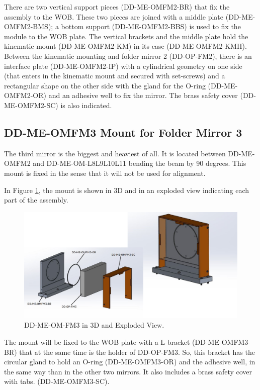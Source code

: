 \documentclass{report}
\begin{document}
There are two vertical support pieces (DD-ME-OMFM2-BR) that fix the assembly to the WOB. These two pieces are joined with a middle plate (DD-ME-OMFM2-BMS); a bottom support (DD-ME-OMFM2-BBS) is used to fix the module to the WOB plate. The vertical brackets and the middle plate hold the kinematic mount (DD-ME-OMFM2-KM) in its case (DD-ME-OMFM2-KMH).
Between the kinematic mounting and folder mirror 2 (DD-OP-FM2), there is an interface plate (DD-ME-OMFM2-IP) with a cylindrical geometry on one side (that enters in the kinematic mount and secured with set-screws) and a rectangular shape on the other side with the gland for the O-ring (DD-ME-OMFM2-OR) and an adhesive well to fix the mirror. The brass safety cover (DD-ME-OMFM2-SC) is also indicated.


\subsection{DD-ME-OMFM3 Mount for Folder Mirror 3}

The third mirror is the biggest and heaviest of all. It is located between DD-ME-OMFM2 and DD-ME-OM-L8L9L10L11 bending the beam by 90 degrees. This mount is fixed in the sense that it will not be used for alignment.

In Figure \ref{figure:FM3}, the mount is shown in 3D and in an exploded view indicating each part of the assembly.

\begin{figure}
\begin{center}
\includegraphics[width=1.0\linewidth]{figures/FM3-ExV.png}
\end{center}
\caption{DD-ME-OM-FM3 in 3D and Exploded View.}
\label{figure:FM3}
\end{figure}

The mount will be fixed to the WOB plate with a L-bracket (DD-ME-OMFM3-BR) that at the same time is the holder of DD-OP-FM3. So, this bracket has the circular gland to hold an O-ring (DD-ME-OMFM3-OR) and the adhesive well, in the same way than in the other two mirrors. It also includes a brass safety cover with tabs. (DD-ME-OMFM3-SC).
\end{document}
